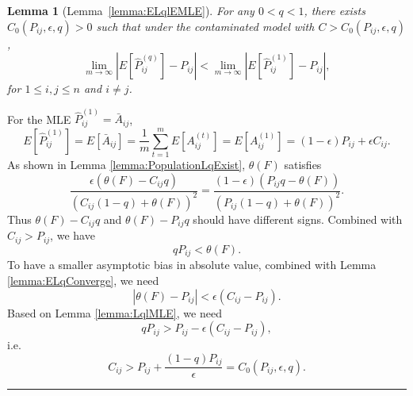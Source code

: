 \documentclass[a4paper]{article}
\newenvironment{proof}{{\bf Proof:  }}{\hfill\rule{2mm}{2mm}}
\newtheorem{lemma}[fact]{Lemma}
\renewcommand{\hat}{\widehat}
\begin{document}
\begin{lemma}[Lemma~\ref{lemma:ELqlEMLE}]
\label{lemma:ELqlEMLEproof}
For any $0 < q < 1$, there exists $C_0(P_{ij}, \epsilon, q) > 0$ such that under the contaminated model with $C > C_0(P_{ij}, \epsilon, q)$,
\[
	\lim_{m \to \infty} \left| E[\hat{P}^{(q)}_{ij}] - P_{ij} \right| < 
    \lim_{m \to \infty} \left| E[\hat{P}^{(1)}_{ij}] - P_{ij} \right|,
\]
for $1 \le i, j \le n$ and $i \ne j$.
\end{lemma}
\begin{proof}
For the MLE $\hat{P}^{(1)}_{ij} = \bar{A}_{ij}$,
\[
	E[\hat{P}^{(1)}_{ij}] = E[\bar{A}_{ij}]
    = \frac{1}{m} \sum_{t = 1}^m E[A_{ij}^{(t)}]
    = E[A_{ij}^{(1)}]
    = (1-\epsilon) P_{ij} + \epsilon C_{ij}.
\]
As shown in Lemma \ref{lemma:PopulationLqExist}, $\theta(F)$ satisfies
\[
\frac{\epsilon (\theta(F) - C_{ij}q)}{(C_{ij}(1-q) + \theta(F))^2} =
\frac{(1-\epsilon) (P_{ij} q - \theta(F))}{(P_{ij}(1-q) + \theta(F))^2}.
\]
Thus $\theta(F) - C_{ij} q$ and $\theta(F) - P_{ij} q$ should have different signs. Combined with $C_{ij} > P_{ij}$, we have
\[
q P_{ij} < \theta(F).
\]
To have a smaller asymptotic bias in absolute value, combined with Lemma \ref{lemma:ELqConverge}, we need
\[
|\theta(F) - P_{ij}| < \epsilon (C_{ij} - P_{ij}).
\]
Based on Lemma \ref{lemma:LqlMLE}, we need
\[
q P_{ij} > P_{ij} - \epsilon(C_{ij} - P_{ij}),
\]
i.e.
\[
C_{ij} > P_{ij} + \frac{(1-q) P_{ij}}{\epsilon} = C_0(P_{ij}, \epsilon, q).
\]
\end{proof}
\end{document}
